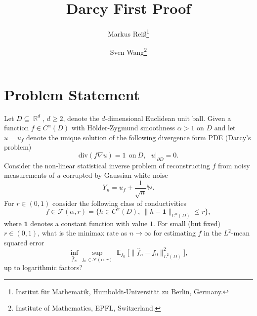 \documentclass{article}
\title{Darcy First Proof}
\author{
Markus Rei{\ss}\thanks{
Institut für Mathematik, Humboldt-Universität zu Berlin, Germany.
}
\and
Sven Wang{}\footnotemark[2]\thanks{
Institute of Mathematics, EPFL, Switzerland.
}
}
\DeclareMathOperator{\E}{{\mathbb E}}
\DeclareMathOperator{\R}{{\mathbb R}}
\begin{document}
\maketitle

\section{Problem Statement}

Let $D\subseteq \R^d$, $d\ge 2$, denote the $d$-dimensional Euclidean unit ball. Given a function $f\in C^\alpha(D)$ with H\"older-Zygmund smoothness $\alpha > 1$ on $D$ and let $u=u_f$ denote the unique solution of the following divergence form PDE (Darcy's problem)
\[ \text{div}(f\nabla u)=1~~\text{on}~D,~~~u|_{\partial D} = 0.\]
Consider the non-linear statistical inverse problem of reconstructing $f$ from noisy measurements of $u$ corrupted by Gaussian white noise
\[Y_n= u_f + \frac 
1{\sqrt n}\mathbb W.\] For $r\in (0,1)$ consider the following class of conductivities
\[ f\in \mathcal F(\alpha, r) = \{ h\in C^\alpha(D),~\|h-\mathbf 1\|_{C^\alpha(D)} \le r \},\]  
where $\mathbf 1$ denotes a  constant function with value $1$. For small (but fixed) $r\in(0,1)$, what is the minimax rate as $n\to\infty$ for estimating $f$ in the ${L^2}$-mean squared error 
\[ \inf_{\hat f_N}\sup_{f_0\in \mathcal F(\alpha, r)} \E_{f_0}\big[ \|\hat f_n-f_0\|_{L^2(D)}^2\big],  \]
up to logarithmic factors?
\end{document}
